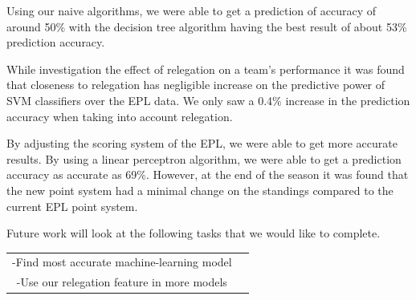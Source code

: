 \documentclass[conference]{IEEEtran}
\begin{document}
Using our naive algorithms, we were able to get a prediction of accuracy of around 50\% with the decision tree algorithm having the best result of about 53\% prediction accuracy. 

While investigation the effect of relegation on a team's performance it was found that closeness to relegation has negligible increase on the predictive power of SVM classifiers over the EPL data. We only saw a 0.4\% increase in the prediction accuracy when taking into account relegation.

By adjusting the scoring system of the EPL, we were able to get more accurate results. By using a linear perceptron algorithm, we were able to get a prediction accuracy as accurate as 69\%. However, at the end of the season it was found that the new point system had a minimal change on the standings compared to the current EPL point system.

Future work will look at the following tasks that we would like to complete.\begin{center}
 \begin{tabular}{@{} cc @{}} 
   \hline
       -Find most accurate machine-learning model\\ 
       -Use our relegation feature in more models\\  
   \hline
 \end{tabular}
\end{center}
\hfill

\end{document}
